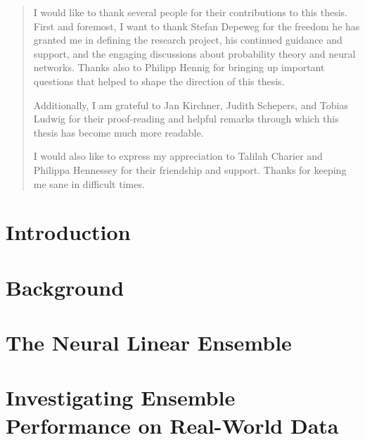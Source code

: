 \documentclass[11pt, A4, twoside, openright]{report}
\newenvironment{acknowledgements} {\renewcommand\abstractname{Acknowledgements}\begin{abstract}} {\end{abstract}}
\begin{document}
\begin{acknowledgements}
    I would like to thank several people for their contributions to this thesis. First and foremost, I want to thank Stefan Depeweg for the freedom he has granted me in defining the research project, his continued guidance and support, and the engaging discussions about probability theory and neural networks.
    Thanks also to Philipp Hennig for bringing up important questions that helped to shape the direction of this thesis.%
    
    
    Additionally, I am grateful to Jan Kirchner, Judith Schepers, and Tobias Ludwig for their proof-reading and helpful remarks through which this thesis has become much more readable.
    
    I would also like to express my appreciation to Talilah Charier and Philippa Hennessey for their friendship and support. Thanks for keeping me sane in difficult times.
\end{acknowledgements}

\setcounter{tocdepth}{1}
\tableofcontents
\thispagestyle{empty}




\chapter{Introduction}
% 






\chapter{Background}
% 






\chapter{The Neural Linear Ensemble}
% 







\chapter{Investigating Ensemble Performance on Real-World Data}
\label{chapter:uci-benchmark}
% 

\end{document}
